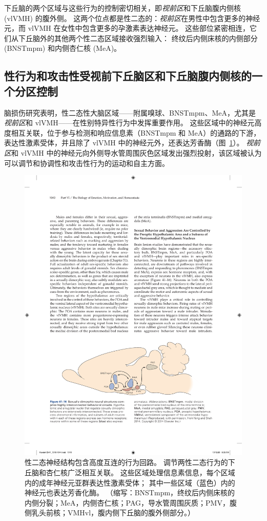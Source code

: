 下丘脑的两个区域与这些行为的控制密切相关，即\textit{视前区}和下丘脑腹内侧核 (vlVMH) 的腹外侧。
这两个位点都是性二态的：\textit{视前区}在男性中包含更多的神经元，而 vlVMH 在女性中包含更多的孕激素表达神经元。
这些部位紧密相连，它们从下丘脑外的其他两个性二态区域接收强烈输入：
终纹后内侧床核的内侧部分 (BNSTmpm) 和内侧杏仁核 (MeA)。



\subsection{性行为和攻击性受视前下丘脑区和下丘脑腹内侧核的一个分区控制}

脑损伤研究表明，性二态性大脑区域——附属嗅球、BNSTmpm、MeA，尤其是\textit{视前区}和 vlVMH——在性别特异性行为中发挥重要作用。
这些区域中的神经元高度相互关联，位于参与检测和响应信息素（BNSTmpm 和 MeA）的通路的下游，表达性激素受体，并且除了 vlVMH 中的神经元外，还表达芳香酶（图~\ref{fig:41_16}）。
\textit{视前区}和 vlVMH 中的神经元向外侧导水管周围灰色区域发出强烈投射，该区域被认为可以调节和协调性和攻击性行为的运动和自主方面。


\begin{figure}[htbp]
	\centering
	\includegraphics[width=0.8\linewidth]{chap41/fig_41_16}
	\caption{性二态神经结构包含高度互连的行为回路。
		调节两性二态行为的下丘脑和杏仁核广泛相互关联。
		这些区域处理信息素信息，每个区域内的成年神经元亚群表达性激素受体；
		其中一些区域（蓝色）内的神经元也表达芳香化酶。 （缩写：BNSTmpm，终纹后内侧床核的内侧分裂；MeA，内侧杏仁核；PAG，导水管周围灰质；PMV，腹侧乳头前核；VMHvl，腹内侧下丘脑的腹外侧部分。）}
	\label{fig:41_16}
\end{figure}


